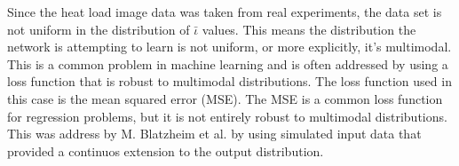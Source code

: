 Since the heat load image data was taken from real experiments, the data set is not uniform in the distribution of $\bar{\iota}$ values. This means the distribution the network is attempting to learn is not uniform, or more explicitly, it's multimodal. This is a common problem in machine learning and is often addressed by using a loss function that is robust to multimodal distributions. The loss function used in this case is the mean squared error (MSE). The MSE is a common loss function for regression problems, but it is not entirely robust to multimodal distributions. This was address by M. Blatzheim et al. \cite{Blatzheim_2018} by using simulated input data that provided a continuos extension to the output distribution.
